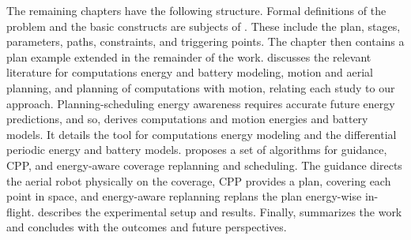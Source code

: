 The remaining chapters have the following structure. Formal definitions of the problem and the basic constructs are subjects of . These include the plan, stages, parameters, paths, constraints, and triggering points. The chapter then contains a plan example extended in the remainder of the work.  discusses the relevant literature for computations energy and battery modeling, motion and aerial planning, and planning of computations with motion, relating each study to our approach. Planning-scheduling energy awareness requires accurate future energy predictions, and so,  derives computations and motion energies and battery models. It details the \powprof{} tool for computations energy modeling and the differential periodic energy and battery models.  proposes a set of algorithms for guidance, CPP, and energy-aware coverage replanning and scheduling. The guidance directs the aerial robot physically on the coverage, CPP provides a plan, covering each point in space, and energy-aware replanning replans the plan energy-wise in-flight.  describes the experimental setup and results. Finally,  summarizes the work and concludes with the outcomes and future perspectives.


